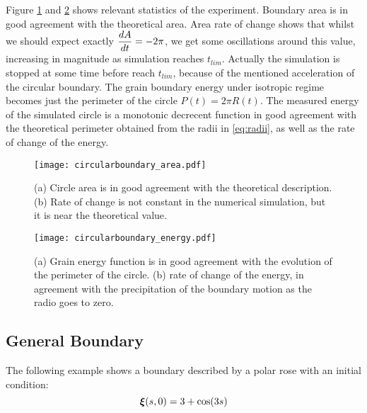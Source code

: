 Figure \ref{fig:circularboundary_area} and \ref{fig:circularboundary_energy} shows relevant statistics of the experiment. Boundary area is in good agreement with the theoretical area. Area rate of change shows that whilst we should expect exactly $\dfrac{dA}{dt} = -2\pi$, we get some oscillations around this value, increasing in magnitude as simulation reaches $t_{lim}$. Actually the simulation is stopped at some time before reach $t_{lim}$, because of the mentioned acceleration of the circular boundary. The grain boundary energy under isotropic regime becomes just the perimeter of the circle $P(t) = 2\pi R(t)$. The measured energy of the simulated circle is a monotonic decrecent function in good agreement with the theoretical perimeter obtained from the radii in \eqref{eq:radii}, as well as the rate of change of the energy. 

\begin{figure}
    \centering
    \texttt{[image: circularboundary\_area.pdf]}
    \subfloat[\label{fig:area}]{\hspace{.55\linewidth}}
    \subfloat[\label{fig:dAdt}]{\hspace{.45\linewidth}}
    \caption[Circular boundary area and rate of change]{(a) Circle area is in good agreement with the theoretical description. (b) Rate of change is not constant in the numerical simulation, but it is near the theoretical value.}
    \label{fig:circularboundary_area}
\end{figure}

\begin{figure}
    \centering
    \texttt{[image: circularboundary\_energy.pdf]}
    \subfloat[\label{fig:energy}]{\hspace{.55\linewidth}}
    \subfloat[\label{fig:dEdt}]{\hspace{.45\linewidth}}
    \caption[Circular boundary energy and rate of change]{(a) Grain energy function is in good agreement with the evolution of the perimeter of the circle. (b) rate of change of the energy, in agreement with the precipitation of the boundary motion as the radio goes to zero.}
    \label{fig:circularboundary_energy}
\end{figure}

\subsection{General Boundary}

The following example shows a boundary described by a polar rose with an initial condition:
\begin{equation*}
    \bm{\xi}(s,0) = 3 + \cos(3s)
\end{equation*}

